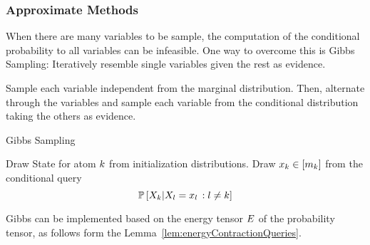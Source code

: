 \subsubsection{Approximate Methods}

When there are many variables to be sample, the computation of the conditional probability to all variables can be infeasible.
One way to overcome this is Gibbs Sampling: Iteratively resemble single variables given the rest as evidence.


Sample each variable independent from the marginal distribution.
Then, alternate through the variables and sample each variable from the conditional distribution taking the others as evidence.

\begin{algorithm}[hbt!]
\caption{Gibbs Sampling}\label{alg:Gibbs}
\begin{algorithmic}
\For{$\catenumeratorin$}
	\State Draw State for atom $k$ from initialization distributions. %
\EndFor
{}
\For{$\catenumeratorin$}
	\State Draw $x_{k}\in[m_{k}]$ from the conditional query
		\[ \mathbb{P}\left[X_{k}|X_{l}=x_{l}\, : l \neq k\right] \]
\EndFor
\EndWhile
\end{algorithmic}
\end{algorithm}



Gibbs can be implemented based on the energy tensor $E$ of the probability tensor, as follows form the Lemma~\ref{lem:energyContractionQueries}.



	


